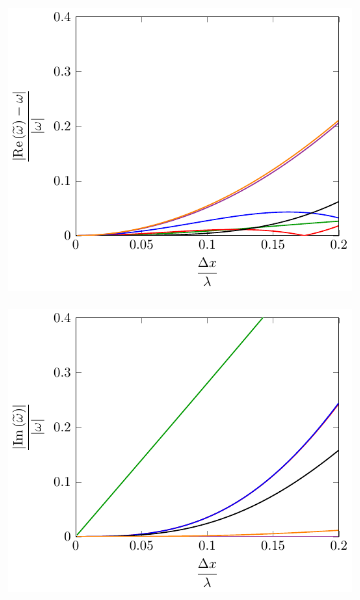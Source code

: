 \begin{figure}
	\centering
	\begin{subfigure}{0.5\textwidth}
		\includegraphics[width=\textwidth]{./chp4/figures/Dispu1khFillRez.pdf}
	\end{subfigure}%
	\begin{subfigure}{0.5\textwidth}
		\includegraphics[width=\textwidth]{./chp4/figures/Dispu1khFillImz.pdf}
	\end{subfigure}
	\begin{subfigure}{0.5\textwidth}

\end{subfigure}
\end{figure}
